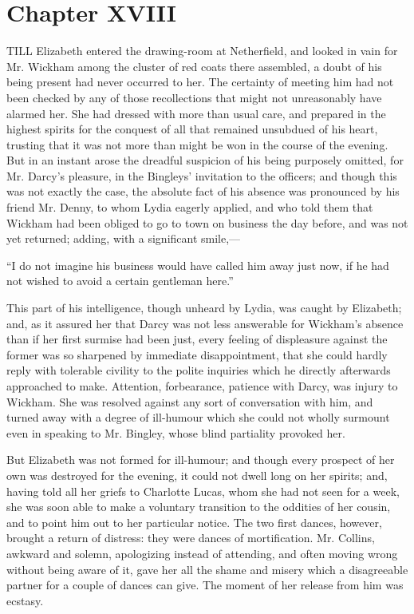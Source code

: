 \documentclass[12pt,openright]{book}
\begin{document}
\chapter{Chapter XVIII}

\noindent  TILL Elizabeth entered the drawing-room at Netherfield, and looked in vain for Mr. Wickham among the cluster of red coats there assembled, a doubt of his being present had never occurred to her. The certainty of meeting him had not been checked by any of those recollections that might not unreasonably have alarmed her. She had dressed with more than usual care, and prepared in the highest spirits for the conquest of all that remained unsubdued of his heart, trusting that it was not more than might be won in the course of the evening. But in an instant arose the dreadful suspicion of his being purposely omitted, for Mr. Darcy’s pleasure, in the Bingleys’ invitation to the officers; and though this was not exactly the case, the absolute fact of his absence was pronounced by his friend Mr. Denny, to whom Lydia eagerly applied, and who told them that Wickham had been obliged to go to town on business the day before, and was not yet returned; adding, with a significant smile,—

“I do not imagine his business would have called him away just now, if he had not wished to avoid a certain gentleman here.”

This part of his intelligence, though unheard by Lydia, was caught by Elizabeth; and, as it assured her that Darcy was not less answerable for Wickham’s absence than if her first surmise had been just, every feeling of displeasure against the former was so sharpened by immediate disappointment, that she could hardly reply with tolerable civility to the polite inquiries which he directly afterwards approached to make. Attention, forbearance, patience with Darcy, was injury to Wickham. She was resolved against any sort of conversation with him, and turned away with a degree of ill-humour which she could not wholly surmount even in speaking to Mr. Bingley, whose blind partiality provoked her.

But Elizabeth was not formed for ill-humour; and though every prospect of her own was destroyed for the evening, it could not dwell long on her spirits; and, having told all her griefs to Charlotte Lucas, whom she had not seen for a week, she was soon able to make a voluntary transition to the oddities of her cousin, and to point him out to her particular notice. The two first dances, however, brought a return of distress: they were dances of mortification. Mr. Collins, awkward and solemn, apologizing instead of attending, and often moving wrong without being aware of it, gave her all the shame and misery which a disagreeable partner for a couple of dances can give. The moment of her release from him was ecstasy.
\end{document}
